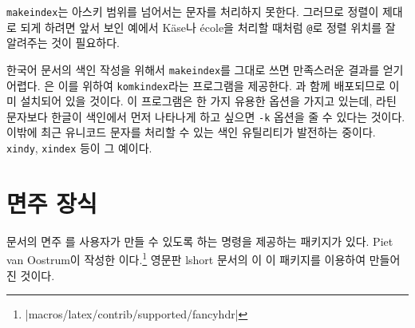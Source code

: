 \texttt{makeindex}는 아스키 범위를 넘어서는 문자를 처리하지 못한다. 그러므로 정렬이 제대로 되게 하려면 앞서 보인 예에서 K\"ase나 \'ecole을 처리할 때처럼 \verb|@|로 정렬 위치를 잘 알려주는 것이 필요하다.

\medskip

\noindent [역자의 보충]
한국어 문서의 색인 작성을 위해서 \texttt{makeindex}를 그대로 쓰면 만족스러운 결과를 얻기 어렵다. \koTeX 은 이를 위하여 \texttt{komkindex}라는 프로그램을 제공한다. \koTeX 과 함께 배포되므로 이미 설치되어 있을 것이다. 이 프로그램은 한 가지 유용한 옵션을 가지고 있는데, 라틴 문자보다 한글이 색인에서 먼저 나타나게 하고 싶으면 \verb|-k| 옵션을 줄 수 있다는 것이다.
이밖에 최근 유니코드 문자를 처리할 수 있는 색인 유틸리티가 발전하는 중이다. \texttt{xindy}, \texttt{xindex} 등이 그 예이다.


\section{면주 장식}
\label{sec:fancy}

문서의 면주%
%
를 사용자가 만들 수 있도록 하는 명령을 제공하는 패키지가 있다. Piet van Oostrum이 작성한 이다.\footnote{\CTAN|macros/latex/contrib/supported/fancyhdr|}
영문판 lshort 문서의 이 이 패키지를 이용하여 만들어진 것이다.%

